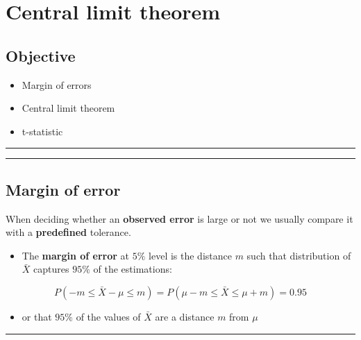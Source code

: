 \documentclass[
]{book}
\providecommand{\tightlist}{%
  \setlength{\itemsep}{0pt}\setlength{\parskip}{0pt}}
\begin{document}
\hypertarget{central-limit-theorem}{%
\chapter{Central limit theorem}\label{central-limit-theorem}}

\hypertarget{objective-10}{%
\section{Objective}\label{objective-10}}

\begin{itemize}
\tightlist
\item
  Margin of errors
\item
  Central limit theorem
\item
  t-statistic
\end{itemize}

\begin{center}\rule{0.5\linewidth}{0.5pt}\end{center}

\begin{center}\rule{0.5\linewidth}{0.5pt}\end{center}

\hypertarget{margin-of-error}{%
\section{Margin of error}\label{margin-of-error}}

When deciding whether an \textbf{observed error} is large or not we usually compare it with a \textbf{predefined} tolerance.

\begin{itemize}
\tightlist
\item
  The \textbf{margin of error} at \(5\%\) level is the distance \(m\) such that distribution of \(\bar{X}\) captures \(95\%\) of the estimations:
\end{itemize}

\[P(-m \leq \bar{X}-\mu \leq m)=P(\mu-m \leq \bar{X} \leq\mu + m)=0.95\]

\begin{itemize}
\tightlist
\item
  or that \(95\%\) of the values of \(\bar{X}\) are a distance \(m\) from \(\mu\)
\end{itemize}

\begin{center}\rule{0.5\linewidth}{0.5pt}\end{center}
\end{document}
